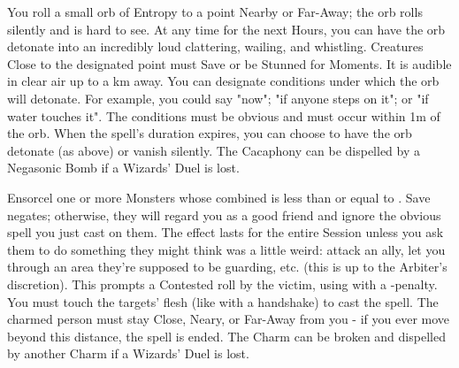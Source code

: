 {\SPELL[
  Name=Cacaphony,
  Link=wizardry-cacaphony,
  Paradigm=Entropy,
  Save=Y (negate),
  Duration=Varies,
  Counter=\mylink{Negasonic Bomb}{wizardry-negasonic-bomb} ,
  Keywords=None,
  Target=Nearby or Far-Away point
]



You roll a small orb of Entropy to a point Nearby or Far-Away; the orb rolls silently and is hard to see.  At any time for the next \SUMDICE Hours, you can have the orb detonate into an incredibly loud clattering, wailing, and
whistling. Creatures Close to the designated point must Save or be Stunned for \DICE Moments. It is audible in clear air up to a \DICE km away. You can designate \DICE conditions under which the orb will detonate. For example,
you could say "now"; "if anyone steps on it"; or "if water touches it".  The conditions must be obvious and must occur within 1m of the orb. When the spell's duration expires, you can choose to have the orb detonate (as above)
or vanish silently.  The Cacaphony can be dispelled by a Negasonic Bomb if a Wizards' Duel is lost.





\SPELL[
  Name=Charm,
  Link=wizardry-charm,
  Paradigm=Mind,
  Save=Y (negate),
  Duration=Session,
  Counter=\mylink{Charm}{wizardry-charm} ,
  Keywords=Contested,
  Target=Close Monster(s)
]



Ensorcel one or more Monsters whose combined \HD is less than or equal to \DICE.  Save negates; otherwise, they will regard you as a good friend and ignore the obvious spell you just cast on them.  The effect lasts for the
entire Session unless you ask them to do something they might think was a little weird: attack an ally, let you through an area they're supposed to be guarding, etc. (this is up to the Arbiter's discretion).  This prompts a
Contested roll by the victim, using \FOC with a -\DICE penalty.  You must touch the targets' flesh (like with a handshake) to cast the spell.  The charmed person must stay Close, Neary, or Far-Away from you - if you ever
move beyond this distance, the spell is ended.  The Charm can be broken and dispelled by another Charm if a Wizards' Duel is lost. 




\SPELL[
  Name=Color Spray,
  Link=wizardry-color-spray,
  Paradigm=Mind,
  Save=Y (negate),
  Duration=0 / Markovian,
  Counter=n/a ,
  Keywords=Splittable,
  Target=Close or Nearby Monster(s)
]



}
